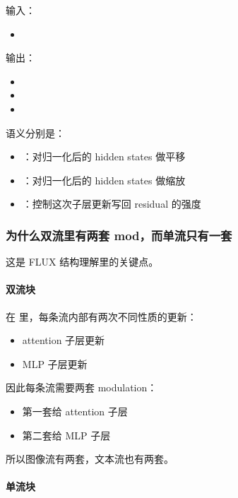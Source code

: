 输入：
\begin{itemize}[leftmargin=1.5em]
  \item {}
\end{itemize}

输出：
\begin{itemize}[leftmargin=1.5em]
  \item {}
  \item {}
  \item {}
\end{itemize}

语义分别是：

\begin{itemize}[leftmargin=1.5em]
  \item {}：对归一化后的 hidden states 做平移
  \item {}：对归一化后的 hidden states 做缩放
  \item {}：控制这次子层更新写回 residual 的强度
\end{itemize}

\subsubsection{为什么双流里有两套 mod，而单流只有一套}

这是 FLUX 结构理解里的关键点。

\paragraph{双流块}

在  里，每条流内部有两次不同性质的更新：

\begin{itemize}[leftmargin=1.5em]
  \item attention 子层更新
  \item MLP 子层更新
\end{itemize}

因此每条流需要两套 modulation：

\begin{itemize}[leftmargin=1.5em]
  \item 第一套给 attention 子层
  \item 第二套给 MLP 子层
\end{itemize}

所以图像流有两套，文本流也有两套。

\paragraph{单流块}

